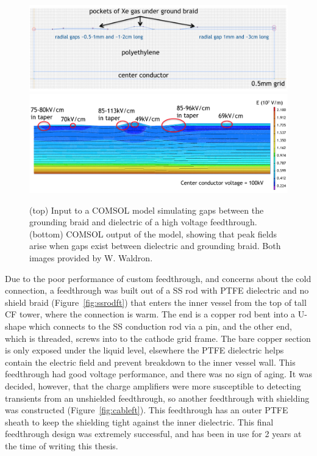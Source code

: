 \begin{figure}[htbp]
\begin{center}
\includegraphics[width=\textwidth]{figures/testbed/will_comsol_1.png}\\
\includegraphics[width=\textwidth]{figures/testbed/will_comsol_2.png}
\caption{(top) Input to a COMSOL model simulating gaps between the grounding braid and dielectric of a high voltage feedthrough. (bottom) COMSOL output of the model, showing that peak fields arise when gaps exist between dielectric and grounding braid. Both images provided by W. Waldron.}
\label{fig:will_comsol}
\end{center}
\end{figure}

Due to the poor performance of custom feedthrough, and concerns about the cold connection, a feedthrough was built out of a \ac{SS} rod with \ac{PTFE} dielectric and no shield braid (Figure~\ref{fig:ssrodft}) that enters the inner vessel from the top of tall CF tower, where the connection is warm. The end is a copper rod bent into a U-shape which connects to the \ac{SS} conduction rod via a pin, and the other end, which is threaded, screws into to the cathode grid frame. The bare copper section is only exposed under the liquid level, elsewhere the \ac{PTFE} dielectric helps contain the electric field and prevent breakdown to the inner vessel wall. This feedthrough had good voltage performance, and there was no sign of aging. It was decided, however, that the charge amplifiers were more susceptible to detecting transients from an unshielded feedthrough, so another feedthrough with shielding was constructed (Figure~\ref{fig:cableft}). This feedthrough has an outer \ac{PTFE} sheath to keep the shielding tight against the inner dielectric. This final feedthrough design was extremely successful, and has been in use for 2 years at the time of writing this thesis.  

